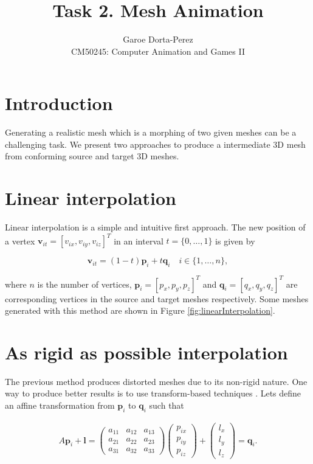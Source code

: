 \documentclass[12pt]{article}
\begin{document}
  
\title{Task 2. Mesh Animation}
\author{Garoe Dorta-Perez\\
CM50245: Computer Animation and Games II}
 
\maketitle
 
\section{Introduction}

Generating a realistic mesh which is a morphing of two given meshes can be a challenging task.
We present two approaches to produce a intermediate 3D mesh from conforming source and target 3D meshes. 

\section{Linear interpolation}

Linear interpolation is a simple and intuitive first approach.
The new position of a vertex $\mathbf{v}_{it} = \left[ v_{ix}, v_{iy}, v_{iz}\right]^T $ in an interval $t = \lbrace 0, \ldots, 1 \rbrace$ is given by

\begin{equation*}
\mathbf{v}_{it} = (1 - t) \mathbf{p}_i + t \mathbf{q}_i \quad i \in \lbrace 1, \ldots, n \rbrace,
\end{equation*}

where $n$ is the number of vertices, $\mathbf{p}_i = \left[ p_x, p_y, p_z\right]^T$ and $\mathbf{q}_i = \left[ q_x, q_y, q_z\right]^T$ are corresponding vertices in the source and target meshes respectively.
Some meshes generated with this method are shown in Figure \ref{fig:linearInterpolation}.

\section{As rigid as possible interpolation}

The previous method produces distorted meshes due to its non-rigid nature.
One way to produce better results is to use transform-based techniques \cite{Alexa2000}.
Lets define an affine transformation from $\mathbf{p}_i$ to $\mathbf{q}_i$ such that

\begin{align*}
A \mathbf{p}_i + \mathbf{l} = \begin{pmatrix}
 a_{11} & a_{12} & a_{13} \\ 
 a_{21} & a_{22} & a_{23} \\ 
 a_{31} & a_{32}  & a_{33} 
\end{pmatrix} 
\begin{pmatrix}
 p_{ix} \\ 
 p_{iy} \\ 
 p_{iz} 
\end{pmatrix} +
\begin{pmatrix}
 l_x \\ 
 l_y \\ 
 l_z
\end{pmatrix} = \mathbf{q}_i.
\end{align*}
\end{document}
